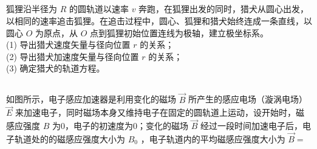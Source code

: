 \subsection{ }
狐狸沿半径为 $R$ 的圆轨道以速率 $v$ 奔跑，在狐狸出发的同时，猎犬从圆心出发，以相同的速率追击狐狸。在追击过程中，圆心、狐狸和猎犬始终连成一条直线，以圆心 $O$ 为原点，从 $O$ 点到狐狸初始位置连线为极轴，建立极坐标系。\\
(1) 导出猎犬速度矢量与径向位置 $r$ 的关系；\\
(2) 导出猎犬加速度矢量与径向位置 $r$ 的关系；\\
(3) 确定猎犬的轨道方程。

\subsection{ }
如图所示，电子感应加速器是利用变化的磁场 $\vec{B}$ 所产生的感应电场（漩涡电场） $\vec{E}$ 来加速电子，同时磁场本身又维持电子在固定的圆轨道上运动，设开始时，磁感应强度 $B$ 为0，电子的初速度为0；变化的磁场 $\vec{B}$ 经过一段时间加速电子后，电子轨道处的的磁感应强度大小为 $B_{0}$ ，电子轨道内的平均磁感应强度大小为 $\vec{B} = $